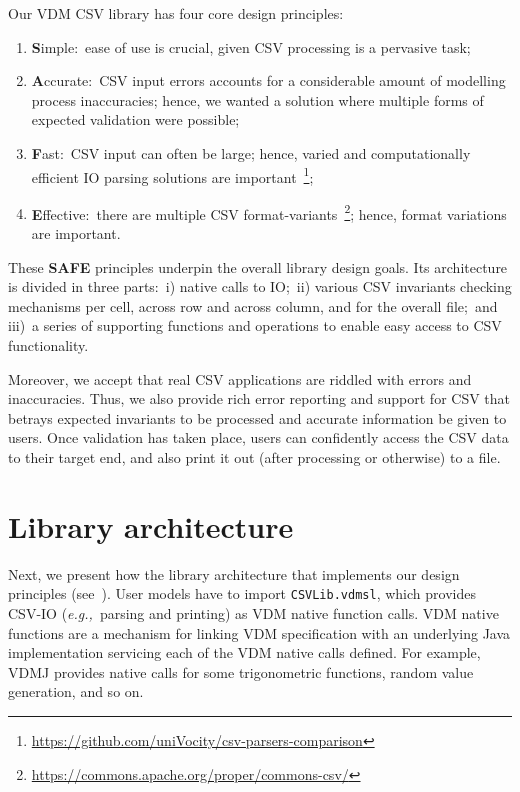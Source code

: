 \documentclass[runningheads,a4paper]{llncs}
\begin{document}
Our VDM CSV library has four core design principles:

	\begin{enumerate}
		\item \textbf{S}imple:~ease of use is crucial, given CSV processing is a pervasive task;
		 
		\item \textbf{A}ccurate:~CSV input errors accounts for a considerable amount of modelling process inaccuracies; hence, we wanted a solution where multiple forms of expected validation were possible;
		 
		\item \textbf{F}ast:~CSV input can often be large; hence, varied and computationally efficient IO parsing solutions are important~\footnote{\url{https://github.com/uniVocity/csv-parsers-comparison}};
		 
		\item \textbf{E}ffective:~there are multiple CSV format-variants~\footnote{\url{https://commons.apache.org/proper/commons-csv/}}; hence, format variations are important.   
	\end{enumerate}

These \textbf{SAFE} principles underpin the overall library design goals. Its architecture is divided in three parts:~i) native calls to IO;~ii) various CSV invariants checking mechanisms per cell, across row and across column, and for the overall file;~and iii)~a series of supporting functions and operations to enable easy access to CSV functionality. 

Moreover, we accept that real CSV applications are riddled with errors and inaccuracies. Thus, we also provide rich error reporting and support for CSV that betrays expected invariants to be processed and accurate information be given to users.  Once validation has taken place, users can confidently access the CSV data to their target end, and also print it out (after processing or otherwise) to a file. 


\section{Library architecture}\label{sec:architecture}

Next, we present how the library architecture that implements our design principles (see~). User models have to import \texttt{CSVLib.vdmsl}, which provides CSV-IO (\textit{e.g.,}~parsing and printing) as VDM native function calls. VDM native functions are a mechanism for linking VDM specification with an underlying Java implementation servicing each of the VDM native calls defined. For example, VDMJ provides native calls for some trigonometric functions, random value generation, and so on.  
\end{document}
